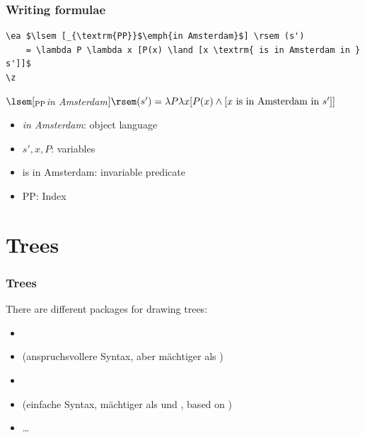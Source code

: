\begin{frame}[fragile]
\frametitle{Writing formulae}

\begin{lstlisting}
\ea $\lsem [_{\textrm{PP}}$\emph{in Amsterdam}$] \rsem (s') 
    = \lambda P \lambda x [P(x) \land [x \textrm{ is in Amsterdam in } s']]$
\z 
\end{lstlisting}


\ea $\lsem [_{\textrm{PP}}$\emph{in Amsterdam}$] \rsem (s') = \lambda P \lambda x [P(x) \land [x \textrm{ is in Amsterdam in } s']]$
\z 

\begin{itemize}
	\item \emph{in Amsterdam}: object language
	\item $s', x, P$: variables
	\item \textrm{is in Amsterdam}: invariable predicate
	\item \textrm{PP}: Index
\end{itemize}

\end{frame}


\section{Trees}

\begin{frame}[fragile]
\frametitle{Trees}

There are different packages for drawing trees:

\begin{itemize}
	\item {}
	\item {} (anspruchsvollere Syntax, aber mächtiger als )
	\item {}
	\item \alert{} (einfache Syntax, mächtiger als  und , based on )
	\item \dots 
\end{itemize}

\end{frame}


